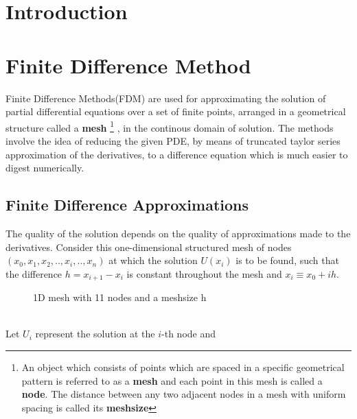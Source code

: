 \documentclass[a4paper,12pt]{article}
\numberwithin{equation}{section}
\begin{document}
\tableofcontents
\newpage
\section{Introduction}
\section{ Finite Difference Method}
Finite Difference Methods(FDM) are used for approximating the solution of partial differential equations over a set of finite points, arranged in a geometrical structure called a \textbf{mesh}%
\footnote[1]{An object which consists of points which are spaced in a specific geometrical pattern is referred to as a \textbf{mesh} and each point in this mesh is called a \textbf{node}. The distance between any two adjacent nodes in a mesh with uniform spacing is called its \textbf{meshsize}}%
, in the continous domain of solution. The methods involve the idea of reducing the given PDE, by means of truncated taylor series approximation of the derivatives, to a difference equation which is much easier to digest numerically. 
\subsection{Finite Difference Approximations}
The quality of the solution depends on the quality of approximations made to the derivatives.
Consider this one-dimensional structured mesh of nodes $(x_0,x_1,x_2,..,x_i,..,x_n)$ at which the solution $U(x_i)$  is to be found, such that the difference $h = x_{i+1} - x_i $ is constant throughout the mesh and $x_i \equiv x_0 + ih$.\\
\begin{figure}[h]
\centering


\caption{\small 1D mesh with 11 nodes and a meshsize h}
\end{figure}
\\
Let $U_i$ represent the solution at the $i$-th node and \hfill
{}
\end{document}
